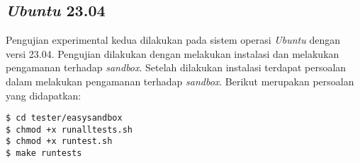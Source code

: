 \subsection{\textit{Ubuntu} 23.04}
Pengujian experimental kedua dilakukan pada sistem operasi \textit{Ubuntu} dengan versi 23.04. Pengujian dilakukan dengan melakukan instalasi dan melakukan pengamanan terhadap \textit{sandbox}. Setelah dilakukan instalasi terdapat persoalan dalam melakukan pengamanan terhadap \textit{sandbox}. Berikut merupakan persoalan yang didapatkan:
\begin{lstlisting}[caption=Pembangunan \textit{sandbox} pada \textit{Ubuntu} 23.04, label=kode:sandbox2304]
$ cd tester/easysandbox
$ chmod +x runalltests.sh
$ chmod +x runtest.sh
$ make runtests
\end{lstlisting}

